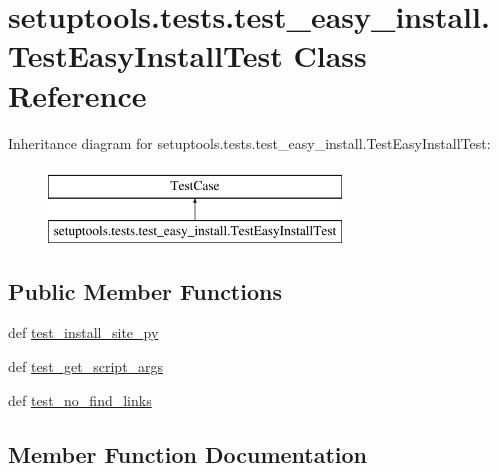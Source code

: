 \hypertarget{classsetuptools_1_1tests_1_1test__easy__install_1_1TestEasyInstallTest}{}\section{setuptools.\+tests.\+test\+\_\+easy\+\_\+install.\+Test\+Easy\+Install\+Test Class Reference}
\label{classsetuptools_1_1tests_1_1test__easy__install_1_1TestEasyInstallTest}
Inheritance diagram for setuptools.\+tests.\+test\+\_\+easy\+\_\+install.\+Test\+Easy\+Install\+Test\+:\begin{figure}[H]
\begin{center}
\leavevmode
\includegraphics[height=2.000000cm]{classsetuptools_1_1tests_1_1test__easy__install_1_1TestEasyInstallTest}
\end{center}
\end{figure}
\subsection*{Public Member Functions}
\begin{DoxyCompactItemize}
\item 
def \hyperlink{classsetuptools_1_1tests_1_1test__easy__install_1_1TestEasyInstallTest_aa45d5b74e5890616097efa5c128f9f92}{test\+\_\+install\+\_\+site\+\_\+py}
\item 
def \hyperlink{classsetuptools_1_1tests_1_1test__easy__install_1_1TestEasyInstallTest_aa9efbb3e19ed2b4541fbb90400386742}{test\+\_\+get\+\_\+script\+\_\+args}
\item 
def \hyperlink{classsetuptools_1_1tests_1_1test__easy__install_1_1TestEasyInstallTest_ae093bf5580e4bcb37b53d44aeb878ca3}{test\+\_\+no\+\_\+find\+\_\+links}
\end{DoxyCompactItemize}


\subsection{Member Function Documentation}
\hypertarget{classsetuptools_1_1tests_1_1test__easy__install_1_1TestEasyInstallTest_aa9efbb3e19ed2b4541fbb90400386742}{}
